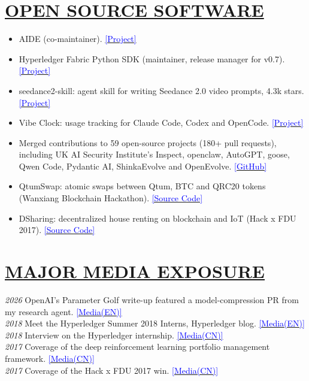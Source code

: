 \documentclass[11pt]{article}
\begin{document}
%
\section*{\centering\underline{OPEN SOURCE SOFTWARE}}
\begin{itemize}[noitemsep, nolistsep]
    \item AIDE (co-maintainer). \href{https://github.com/WecoAI/aideml}{\textcolor{blue}{[Project]}}
    \item Hyperledger Fabric Python SDK (maintainer, release manager for v0.7). \href{https://github.com/hyperledger/fabric-sdk-py}{\textcolor{blue}{[Project]}}
    \item seedance2-skill: agent skill for writing Seedance 2.0 video prompts, 4.3k stars. \href{https://github.com/dexhunter/seedance2-skill}{\textcolor{blue}{[Project]}}
    \item Vibe Clock: usage tracking for Claude Code, Codex and OpenCode. \href{https://github.com/dexhunter/vibe-clock}{\textcolor{blue}{[Project]}}
    \item Merged contributions to 59 open-source projects (180+ pull requests), including UK AI Security Institute's Inspect, openclaw, AutoGPT, goose, Qwen Code, Pydantic AI, ShinkaEvolve and OpenEvolve. \href{https://github.com/dexhunter}{\textcolor{blue}{[GitHub]}}
    \item QtumSwap: atomic swaps between Qtum, BTC and QRC20 tokens (Wanxiang Blockchain Hackathon). \href{https://github.com/PRIEWIENV/QtumSwap}{\textcolor{blue}{[Source Code]}}
    \item DSharing: decentralized house renting on blockchain and IoT (Hack x FDU 2017). \href{https://github.com/dexhunter/hackxfdu-DSharing}{\textcolor{blue}{[Source Code]}}
\end{itemize}
\vspace{20mm} %

%
\section*{\centering\underline{MAJOR MEDIA EXPOSURE}}
\noindent\textit{2026} OpenAI's Parameter Golf write-up featured a model-compression PR from my research agent. \href{https://openai.com/index/what-parameter-golf-taught-us/}{\textcolor{blue}{\mbox{[Media(EN)]}}}\\[\baselineskip]
\noindent\textit{2018} Meet the Hyperledger Summer 2018 Interns, Hyperledger blog. \href{https://www.hyperledger.org/blog/2018/06/13/meet-the-hyperledger-summer-2018-interns-part-2}{\textcolor{blue}{[Media(EN)]}}\\[\baselineskip]
\noindent\textit{2018} Interview on the Hyperledger internship. \href{https://archive.is/5nyBm}{\textcolor{blue}{[Media(CN)]}}\\[\baselineskip]
\noindent\textit{2017} Coverage of the deep reinforcement learning portfolio management framework. \href{https://archive.is/XKqY3}{\textcolor{blue}{[Media(CN)]}}\\[\baselineskip]
\noindent\textit{2017} Coverage of the Hack x FDU 2017 win. \href{https://archive.is/FzYVh}{\textcolor{blue}{[Media(CN)]}}
\end{document}
